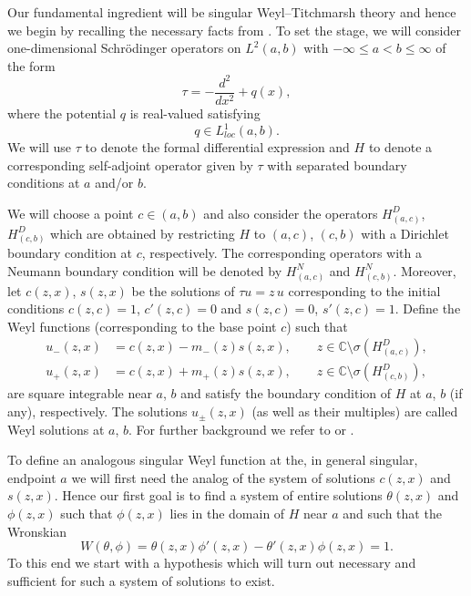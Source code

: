 \documentclass{amsart}
\numberwithin{equation}{section}
\begin{document}
Our fundamental ingredient will be singular Weyl--Titchmarsh theory and hence we begin by recalling
the necessary facts from \cite{kst2}.
To set the stage, we will consider one-dimensional Schr\"odinger operators on $L^2(a,b)$
with $-\infty \le a<b \le \infty$ of the form
\begin{equation} \label{stli}
\tau = - \frac{d^2}{dx^2} + q(x),
\end{equation}
where the potential $q$ is real-valued satisfying
\begin{equation}
q \in L^1_{loc}(a,b).
\end{equation}
We will use $\tau$ to denote the formal differential expression and $H$ to denote a corresponding
self-adjoint operator given by $\tau$ with separated boundary conditions at $a$ and/or $b$.

We will choose a point $c\in(a,b)$ and also consider the operators $H^D_{(a,c)}$, $H^D_{(c,b)}$
which are obtained by restricting $H$ to $(a,c)$, $(c,b)$ with a Dirichlet boundary condition at
$c$, respectively. The corresponding operators with a Neumann boundary condition will be
denoted by $H^N_{(a,c)}$ and $H^N_{(c,b)}$. 
Moreover, let $c(z,x)$, $s(z,x)$ be the solutions of $\tau u = z\, u$ corresponding
to the initial conditions $c(z,c)=1$, $c'(z,c)=0$ and $s(z,c)=0$, $s'(z,c)=1$. 
Define the Weyl functions (corresponding to the base point $c$) such that
\begin{subequations}
\begin{align}
u_-(z,x) &= c(z,x) - m_-(z) s(z,x), \qquad z\in{{\mathbb C}}\setminus{\sigma}(H^D_{(a,c)}),\\\label{defupm}
u_+(z,x) &= c(z,x) + m_+(z) s(z,x), \qquad z\in{{\mathbb C}}\setminus{\sigma}(H^D_{(c,b)}),
\end{align}
\end{subequations}
are square integrable near $a$, $b$ and satisfy the boundary condition of $H$
at $a$, $b$ (if any), respectively. The solutions $u_\pm(z,x)$ (as well as their multiples)
are called Weyl solutions at $a$, $b$.
For further background we refer to \cite[Chap.~9]{tschroe} or \cite{wdln}.

To define an analogous singular Weyl function at the, in general singular, endpoint $a$ we will
first need the analog of the system of solutions $c(z,x)$ and $s(z,x)$. Hence our first goal is
to find a system of entire solutions $\theta(z,x)$ and $\phi(z,x)$ such that $\phi(z,x)$ lies in the domain of
$H$ near $a$ and such that the Wronskian
\begin{equation}
W(\theta,\phi)= \theta(z,x) \phi'(z,x) - \theta'(z,x)\phi(z,x)=1.
\end{equation}
To this end we start with a
hypothesis which will turn out necessary and sufficient for such a system of solutions to exist.
\end{document}
